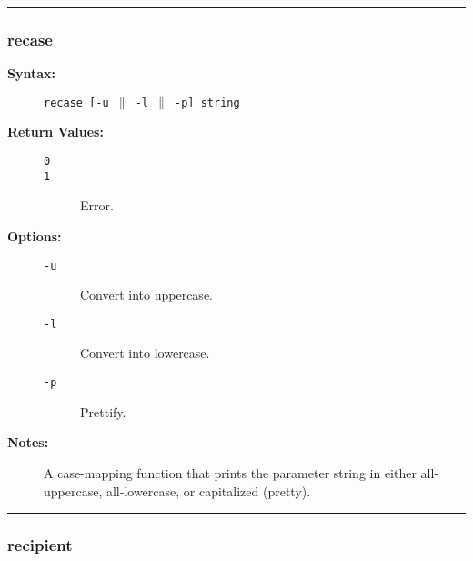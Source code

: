 \hrule
\subsubsection{recase}

\begin{description}
\item[{\bf Syntax:}] \mbox{}

{\tt recase [-u $\|$ -l $\|$ -p] string}

\item[{\bf Return Values:}] \mbox{}

\begin{description}
\item[{\tt 0}] \mbox{}



\item[{\tt 1}] \mbox{}

Error.

\end{description}


\item[{\bf Options:}] \mbox{}

\begin{description}
\item[{\tt -u}] \mbox{}

Convert into uppercase.

\item[{\tt -l}] \mbox{}

Convert into lowercase.

\item[{\tt -p}] \mbox{}

Prettify.

\end{description}


\item[{\bf Notes:}] \mbox{}

A case-mapping function that prints the parameter 
string in either all-uppercase, all-lowercase, or capitalized (pretty).

\end{description}


\hrule
\subsubsection{recipient}

